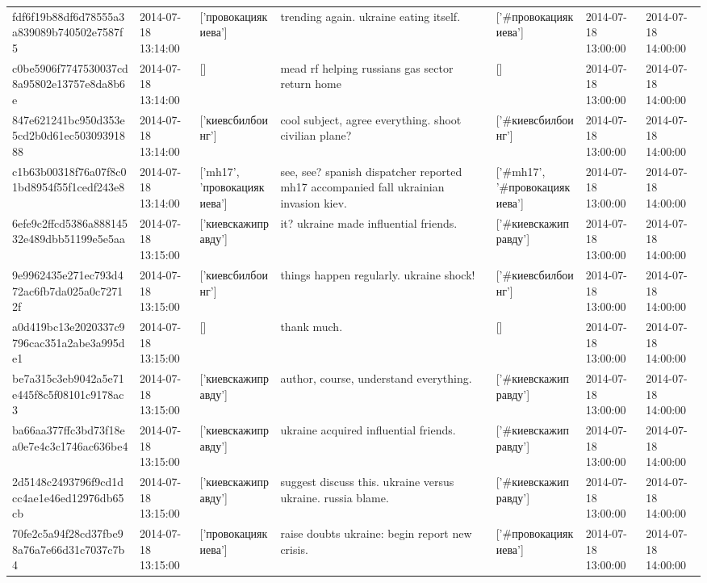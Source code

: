 \begin{tabular}{lllllll}
fdf6f19b88df6d78555a3a839089b740502e7587f5 & 2014-07-18 13:14:00 & ['провокациякиева'] & trending again. ukraine eating itself. & ['#провокациякиева'] & 2014-07-18 13:00:00 & 2014-07-18 14:00:00 \\
c0be5906f7747530037cd8a95802e13757e8da8b6e & 2014-07-18 13:14:00 & [] & mead rf helping russians gas sector return home & [] & 2014-07-18 13:00:00 & 2014-07-18 14:00:00 \\
847e621241bc950d353e5cd2b0d61ec50309391888 & 2014-07-18 13:14:00 & ['киевсбилбоинг'] & cool subject, agree everything. shoot civilian plane? & ['#киевсбилбоинг'] & 2014-07-18 13:00:00 & 2014-07-18 14:00:00 \\
c1b63b00318f76a07f8c01bd8954f55f1cedf243e8 & 2014-07-18 13:14:00 & ['mh17', 'провокациякиева'] & see, see? spanish dispatcher reported mh17 accompanied fall ukrainian invasion kiev. & ['#mh17', '#провокациякиева'] & 2014-07-18 13:00:00 & 2014-07-18 14:00:00 \\
6efe9c2ffcd5386a88814532e489dbb51199e5e5aa & 2014-07-18 13:15:00 & ['киевскажиправду'] & it? ukraine made influential friends. & ['#киевскажиправду'] & 2014-07-18 13:00:00 & 2014-07-18 14:00:00 \\
9e9962435e271ec793d472ac6fb7da025a0c72712f & 2014-07-18 13:15:00 & ['киевсбилбоинг'] & things happen regularly. ukraine shock! & ['#киевсбилбоинг'] & 2014-07-18 13:00:00 & 2014-07-18 14:00:00 \\
a0d419bc13e2020337c9796cac351a2abe3a995de1 & 2014-07-18 13:15:00 & [] & thank much. & [] & 2014-07-18 13:00:00 & 2014-07-18 14:00:00 \\
be7a315c3eb9042a5e71e445f8c5f08101c9178ac3 & 2014-07-18 13:15:00 & ['киевскажиправду'] & author, course, understand everything. & ['#киевскажиправду'] & 2014-07-18 13:00:00 & 2014-07-18 14:00:00 \\
ba66aa377ffc3bd73f18ea0e7e4c3c1746ac636be4 & 2014-07-18 13:15:00 & ['киевскажиправду'] & ukraine acquired influential friends. & ['#киевскажиправду'] & 2014-07-18 13:00:00 & 2014-07-18 14:00:00 \\
2d5148c2493796f9cd1dcc4ae1e46ed12976db65cb & 2014-07-18 13:15:00 & ['киевскажиправду'] & suggest discuss this. ukraine versus ukraine. russia blame. & ['#киевскажиправду'] & 2014-07-18 13:00:00 & 2014-07-18 14:00:00 \\
70fe2c5a94f28cd37fbe98a76a7e66d31c7037c7b4 & 2014-07-18 13:15:00 & ['провокациякиева'] & raise doubts ukraine: begin report new crisis. & ['#провокациякиева'] & 2014-07-18 13:00:00 & 2014-07-18 14:00:00 \\

\end{tabular}
